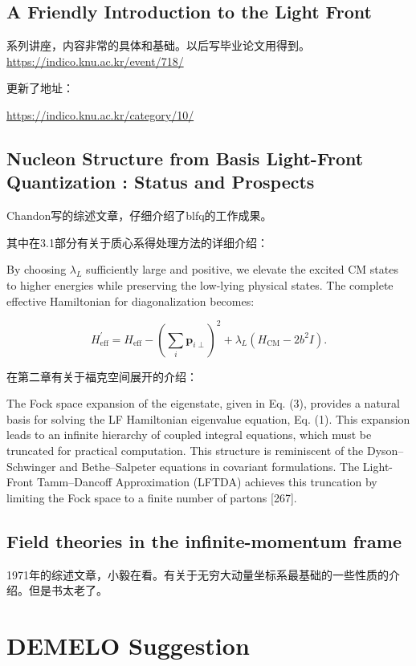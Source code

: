 \documentclass{article}
\begin{document}
\subsection{A Friendly Introduction to the Light Front}

系列讲座，内容非常的具体和基础。以后写毕业论文用得到。
\url{https://indico.knu.ac.kr/event/718/}

更新了地址：

\url{https://indico.knu.ac.kr/category/10/}

\subsection{Nucleon Structure from Basis Light-Front
Quantization : Status and Prospects}

Chandon写的综述文章，仔细介绍了blfq的工作成果。

其中在3.1部分有关于质心系得处理方法的详细介绍：

By choosing $\lambda_L$ sufficiently large and positive, we elevate the excited CM states to
higher energies while preserving the low-lying physical states. The complete effective
Hamiltonian for diagonalization becomes:

\begin{equation}
    H_{\mathrm{eff}}^{\prime}=H_{\mathrm{eff}}-\left(\sum_i \boldsymbol{p}_{i \perp}\right)^2+\lambda_L\left(H_{\mathrm{CM}}-2 b^2 I\right) .
\end{equation}


在第二章有关于福克空间展开的介绍：

The Fock space expansion of the eigenstate, given in Eq. (3), provides a natural
basis for solving the LF Hamiltonian eigenvalue equation, Eq. (1). This expansion
leads to an infinite hierarchy of coupled integral equations, which must be truncated
for practical computation. This structure is reminiscent of the Dyson–Schwinger and
Bethe–Salpeter equations in covariant formulations. The Light-Front Tamm–Dancoff
Approximation (LFTDA) achieves this truncation by limiting the Fock space to a
finite number of partons [267]. 

\subsection{Field theories in the infinite-momentum frame }

1971年的综述文章，小毅在看。有关于无穷大动量坐标系最基础的一些性质的介绍。但是书太老了。


\section{DEMELO Suggestion}
\end{document}
